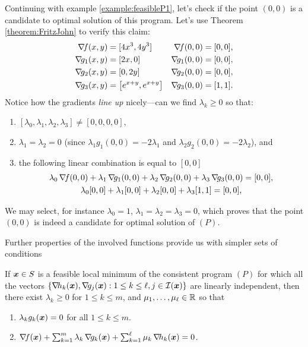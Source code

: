 \begin{example}
Continuing with example \ref{example:feasibleP1}, let's check if the point $(0,0)$ is a candidate to optimal solution of this program.  Let's use Theorem \ref{theorem:FritzJohn} to verify this claim:
\begin{align*}
\gradient{f}(x,y) &= [ 4x^3, 4y^3 ] &\gradient{f}(0,0) &= [0,0], \\
\gradient{g_1}(x,y) &= [ 2x, 0 ] &\gradient{g_1}(0,0) &= [0,0], \\
\gradient{g_2}(x,y) &= [0, 2y] &\gradient{g_2}(0,0) &= [0,0], \\
\gradient{g_3}(x,y) &= \big[e^{x+y}, e^{x+y} \big] &\gradient{g_3}(0,0) &= [1,1].
\end{align*}
Notice how the gradients \emph{line up} nicely---can we find $\lambda_k \geq 0$ so that:
\begin{enumerate}
	\item $[\lambda_0, \lambda_1, \lambda_2, \lambda_3] \neq [0,0,0,0]$,
	\item $\lambda_1=\lambda_2=0$ (since $\lambda_1 g_1(0,0) = -2\lambda_1$ and $\lambda_2 g_2(0,0) = -2\lambda_2$), and
	\item the following linear combination is equal to $[0,0]$
	\begin{gather*}
	\lambda_0\mathop{\nabla\! {f}}(0,0) + \lambda_1 \mathop{\nabla\! {g_1}}(0,0) + \lambda_2 \mathop{\nabla\! {g_2}}(0,0) + \lambda_3 \mathop{\nabla\! {g_3}}(0,0) = [0,0], \\
	\lambda_0[0,0] + \lambda_1[0,0] + \lambda_2[0,0] + \lambda_3[1,1] = [0,0],
	\end{gather*}
\end{enumerate}
We may select, for instance $\lambda_0=1$, $\lambda_1=\lambda_2=\lambda_3=0$, which proves that the point $(0,0)$ is indeed a candidate for optimal solution of $(P)$.
\end{example}

\separator
Further properties of the involved functions provide us with simpler sets of conditions

\begin{theorem}\label{theorem:KKTnecessary}
If $\boldsymbol{x} \in S$ is a feasible local minimum of the consistent program $(P)$ for which all the vectors $\{ \mathop{\nabla\! {h_k}}(\boldsymbol{x}), \mathop{\nabla\! {g_j}}(\boldsymbol{x}) : 1 \leq k \leq \ell, j \in \mathcal{I}(\boldsymbol{x}) \}$ are linearly independent, then there exist $\lambda_k \geq 0$ for $1\leq k \leq m$, and $\mu_1, \dots, \mu_\ell \in \mathbb{R}$ so that
\begin{enumerate}
 	\item\label{item:KKTnecessary1} $\lambda_k g_k(\boldsymbol{x}) = 0$ for all $1 \leq k \leq m$.
 	\item\label{item:KKTnecessary2} $\mathop{\nabla\! {f}}(\boldsymbol{x}) + \sum_{k=1}^m \lambda_k \mathop{\nabla\! {g_k}}(\boldsymbol{x}) + \sum_{k=1}^\ell \mu_k \mathop{\nabla\! {h_k}}(\boldsymbol{x}) = 0$.
 \end{enumerate}
\end{theorem}

